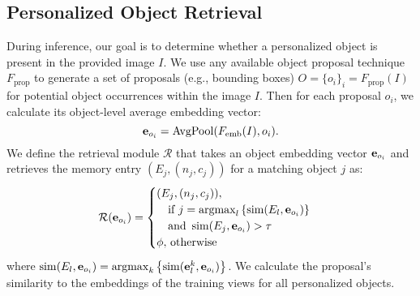 \subsection{Personalized Object Retrieval}
\vspace{-0.1cm}
\label{sec:retrieval}
During inference, our goal is to determine whether a personalized object is present in the provided image $I$.
We use any available object proposal technique $F_\text{prop}$ to generate a set of proposals (e.g., bounding boxes) $O=\{o_i\}_i=F_\text{prop}(I)$ for potential object occurrences within the image $I$.
Then for each proposal $o_i$, we calculate its object-level average embedding vector:
\begin{equation}
\mathbf{e}_{o_i} = \operatorname{AvgPool}(F_\text{emb}{(I),o_i}).
\end{equation}
We define the retrieval module $\mathcal{R}$ that takes an object embedding vector $\mathbf{e}_{o_i}$ and retrieves the memory entry $(E_j, (n_j, c_j))$ for a matching object $j$ as:%
\vspace{-0.2cm}
\begin{equation}
\mathcal{R}(\mathbf{e}_{o_i}) = 
\begin{cases} 
    (E_j, (n_j, c_j)),\\
    \quad \text{if } j = \mathop{\mathrm{argmax}}_l\left\{\operatorname{sim}(E_l, \mathbf{e}_{o_i})\right\} \\
     \quad \text{and } \operatorname{sim}(E_j,\mathbf{e}_{o_i}) > \tau \\
    \phi,\, \text{otherwise}
\end{cases}
\end{equation}
where $\operatorname{sim}(E_l,\mathbf{e}_{o_i})= \mathop{\mathrm{argmax}}_k\left\{\operatorname{sim}(\mathbf{e}_l^k, \mathbf{e}_{o_i})\right\}$.
We calculate the proposal's similarity to the embeddings of the training views for all personalized objects.

